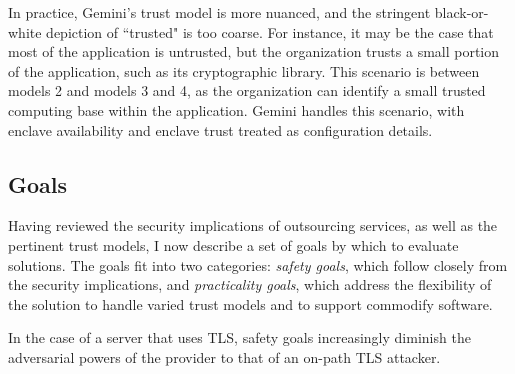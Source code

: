 In practice, Gemini's trust model is more nuanced, and the stringent
black-or-white depiction of ``trusted" is too coarse.
%
For instance, it may be the case that most of the application is untrusted, but
the organization trusts a small portion of the application, such as its
cryptographic library.
%
This scenario is between models 2 and models 3 and 4, as the organization can
identify a small trusted computing base within the application.
%
Gemini handles this scenario, with enclave availability and enclave trust
treated as configuration details.


\subsection{Goals}

Having reviewed the security implications of outsourcing services, as well as
the pertinent trust models, I now describe a set of goals by which to evaluate
solutions.
%
The goals fit into two categories: \emph{safety goals}, which follow closely
from the security implications, and \emph{practicality goals}, which address
the flexibility of the solution to handle varied trust models and to support
commodify software.

%
In the case of a server that uses TLS, safety goals increasingly diminish the
adversarial powers of the provider to that of an on-path TLS attacker.

